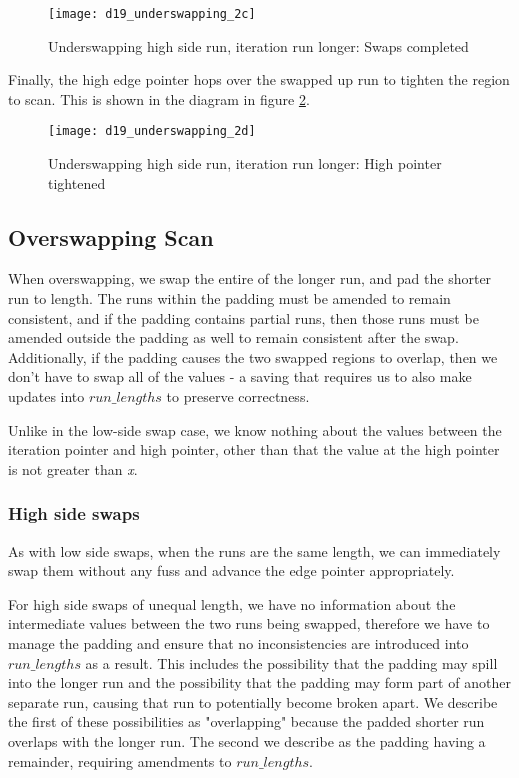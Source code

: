 \begin{figure}[H]
  \centering
  \texttt{[image: d19\_underswapping\_2c]}
  \caption{Underswapping high side run, iteration run longer: Swaps completed}
  \label{fig:underswapping_2c}
\end{figure}

Finally, the high edge pointer hops over the swapped up run to tighten the region to scan. This is shown in the diagram in figure \ref{fig:underswapping_2d}.

\begin{figure}[H]
  \centering
  \texttt{[image: d19\_underswapping\_2d]}
  \caption{Underswapping high side run, iteration run longer: High pointer tightened}
  \label{fig:underswapping_2d}
\end{figure}

\subsection{Overswapping Scan}

When overswapping, we swap the entire of the longer run, and pad the shorter run to length. The runs within the padding must be amended to remain consistent, and if the padding contains partial runs, then those runs must be amended outside the padding as well to remain consistent after the swap. Additionally, if the padding causes the two swapped regions to overlap, then we don't have to swap all of the values - a saving that requires us to also make updates into $run\_lengths$ to preserve correctness.

Unlike in the low-side swap case, we know nothing about the values between the iteration pointer and high pointer, other than that the value at the high pointer is not greater than \textit{x}.

\subsubsection{High side swaps}

As with low side swaps, when the runs are the same length, we can immediately swap them without any fuss and advance the edge pointer appropriately.

For high side swaps of unequal length, we have no information about the intermediate values between the two runs being swapped, therefore we have to manage the padding and ensure that no inconsistencies are introduced into $run\_lengths$ as a result. This includes the possibility that the padding may spill into the longer run and the possibility that the padding may form part of another separate run, causing that run to potentially become broken apart. We describe the first of these possibilities as "overlapping" because the padded shorter run overlaps with the longer run. The second we describe as the padding having a remainder, requiring amendments to $run\_lengths$.

